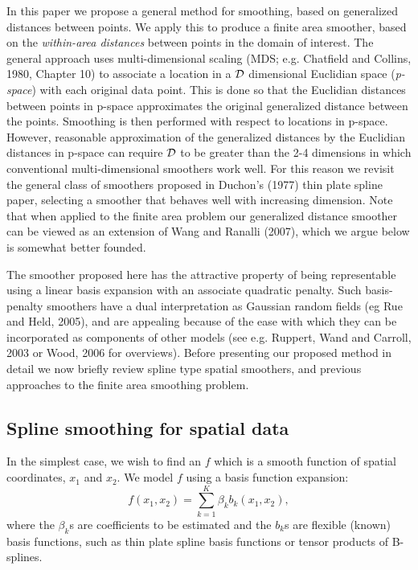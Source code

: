 \documentclass[useAMS, referee]{biom}
\begin{document}
In this paper we propose a general method for smoothing, based on generalized distances between points. We apply this to produce a finite area smoother, based on the \textit{within-area distances} between points in the domain of interest. The general approach uses multi-dimensional scaling (MDS; e.g. Chatfield and Collins, 1980, Chapter 10) to associate a location in a $\cal D$ dimensional Euclidian space ({\em p-space}) with each original data point. This is done so that the Euclidian distances between points in p-space approximates the original generalized distance between the points. Smoothing is then performed with respect to locations in p-space. However, reasonable approximation of the generalized distances by the Euclidian distances in p-space can require $\cal D$ to be greater than the 2-4 dimensions in which conventional multi-dimensional smoothers work well. For this reason we revisit the general class of smoothers proposed in Duchon's (1977) thin plate spline paper, selecting a smoother that behaves well with increasing dimension. Note that when applied to the finite area problem our generalized distance smoother can be viewed as an extension of Wang and Ranalli (2007), which we argue below is somewhat better founded.

The smoother proposed here has the attractive property of being representable using a linear basis expansion with an associate quadratic penalty. Such basis-penalty smoothers have a dual interpretation as Gaussian random fields (eg Rue and Held, 2005), and are appealing because of the ease with which they can be incorporated as components of other models  
(see e.g. Ruppert, Wand and Carroll, 2003 or Wood, 2006 for overviews). Before presenting our proposed method in detail we now briefly review spline type spatial smoothers, and previous approaches to the finite area smoothing problem.

\subsection{Spline smoothing for spatial data}

In the simplest case, we wish to find an $f$ which is a smooth function of spatial coordinates, $x_1$ and $x_2$. We model $f$ using a basis function expansion:
\begin{equation}
f(x_{1}, x_{2}) = \sum_{k=1}^K \beta_k b_k(x_{1}, x_{2}),
\label{basis-exp}
\end{equation}
where the $\beta_k$s are coefficients to be estimated and the $b_k$s are flexible (known) basis functions, such as thin plate spline basis functions or tensor products of B-splines. 
\end{document}
